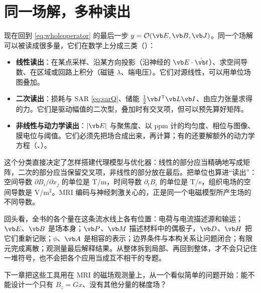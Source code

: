 \section{同一场解，多种读出}\label{sec:framework-readouts}

现在回到 \eqref{eq:wholeoperator} 的最后一步 $y=\mathcal O(\vb E,\vb B,\vb J)$。同一个场解可以被读成很多量，它们在数学上分成三类（）：
\begin{itemize}
\item \textbf{线性读出}：在某点采样、沿某方向投影（沿神经的 $\vb E\cdot\hat{\vb t}$）、求空间导数、在区域或回路上积分（磁链 $\lambda$、端电压）。它们对源线性，可以用单位场图叠加。
\item \textbf{二次读出}：损耗与 SAR \eqref{eq:sarQ}、储能 $\tfrac12\vb I^{\mathsf T}\vb L\vb I$、由应力张量求得的力。它们是驱动幅值的二次型，叠加时有交叉项，但可以预先算好矩阵。
\item \textbf{非线性与动力学读出}：$|\vb E|$ 与聚焦度、以 ppm 计的均匀度、相位与图像、膜电位与阈值。它们必须先把场合成出来，再计算；有的还要解额外的动力学方程（、）。
\end{itemize}


这个分类直接决定了怎样搭建代理模型与优化器：线性的部分应当精确地写成矩阵，二次的部分应当保留交叉项，非线性的部分放在最后。把单位也算进“读出”：空间导数 $\partial B_i/\partial x_j$ 的单位是 T/m，时间导数 $\partial_tB_i$ 的单位是 T/s，组织电场的空间导数是 $\mathrm{V/m^2}$。MRI 编码与神经刺激关心的，正是同一个电磁模型所产生场的不同导数。

回头看，全书的各个量在这条流水线上各有位置：电荷与电流描述源和输运；$\vb E$、$\vb B$ 是场本身；$\vb P$、$\vb M$ 描述材料中的偶极子，$\vb D$、$\vb H$ 把它们重新记账；$\phi$、$\vb A$ 是相容的表示；边界条件与本构关系让问题闭合；有限元完成离散；观测量最后解释结果。从整体拆到局部、再回到整体，才不会只记住一堆符号，也不会把各个应用当成互不相干的专题。

下一章把这些工具用在 MRI 的磁场观测量上，从一个看似简单的问题开始：能不能设计一个只有 $B_z=Gx$、没有其他分量的梯度场？

